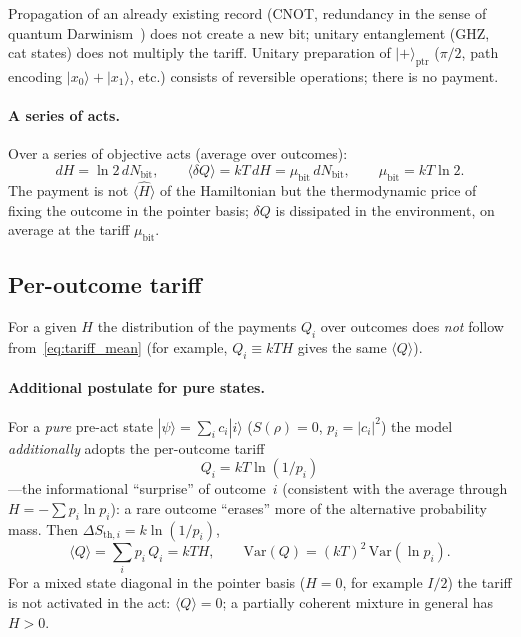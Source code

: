 \documentclass[11pt,a4paper]{article}
\begin{document}
Propagation of an already existing record (CNOT, redundancy in the sense of quantum Darwinism~\cite{zurek2009}) does not create a new bit; unitary entanglement (GHZ, cat states) does not multiply the tariff. Unitary preparation of $|{+}\rangle_{\mathrm{ptr}}$ ($\pi/2$, path encoding $|x_0\rangle+|x_1\rangle$, etc.) consists of reversible operations; there is no payment.

\paragraph{A series of acts.}
Over a series of objective acts (average over outcomes):
\begin{equation}
dH = \ln 2\,dN_{\mathrm{bit}}, \qquad \langle\delta Q\rangle = kT\,dH = \mu_{\mathrm{bit}}\,dN_{\mathrm{bit}}, \qquad \mu_{\mathrm{bit}} = kT\ln 2.
\end{equation}
The payment is not $\langle\hat{H}\rangle$ of the Hamiltonian but the thermodynamic price of fixing the outcome in the pointer basis; $\delta Q$ is dissipated in the environment, on average at the tariff $\mu_{\mathrm{bit}}$.

\subsection{Per-outcome tariff}\label{sec:outcomes}

For a given $H$ the distribution of the payments $Q_i$ over outcomes does \emph{not} follow from~\eqref{eq:tariff_mean} (for example, $Q_i \equiv kT H$ gives the same $\langle Q\rangle$).

\paragraph{Additional postulate for pure states.}
For a \emph{pure} pre-act state $|\psi\rangle=\sum_i c_i|i\rangle$ ($S(\rho)=0$, $p_i=|c_i|^2$) the model \emph{additionally} adopts the per-outcome tariff
\begin{equation}
\boxed{Q_i = kT\ln(1/p_i)}
\end{equation}
---the informational ``surprise'' of outcome~$i$ (consistent with the average through $H=-\sum p_i\ln p_i$): a rare outcome ``erases'' more of the alternative probability mass. Then $\Delta S_{\mathrm{th},i}=k\ln(1/p_i)$,
\begin{equation}
\langle Q\rangle = \sum_i p_i\, Q_i = kT H, \qquad \mathrm{Var}(Q) = (kT)^2\,\mathrm{Var}(\ln p_i).
\end{equation}
For a mixed state diagonal in the pointer basis ($H=0$, for example $I/2$) the tariff is not activated in the act: $\langle Q\rangle=0$; a partially coherent mixture in general has $H>0$.
\end{document}

